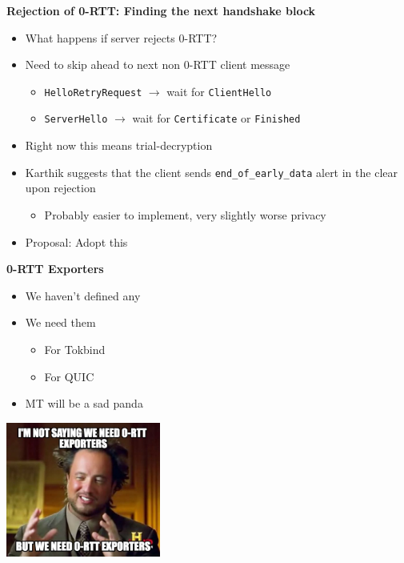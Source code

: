 \documentclass[helvetica]{seminar}
\newcommand{\heading}[1]{%
  \begin{center} 
    \large\bf 
    #1 
  \end{center} 
  \vspace{.4 in}}
\begin{document}
\begin{slide}
\heading{Rejection of 0-RTT: Finding the next handshake block}

\begin{itemize}
\item What happens if server rejects 0-RTT?
\item Need to skip ahead to next non 0-RTT client message
  \begin{itemize}
  \item \verb^HelloRetryRequest^ $\rightarrow$ wait for \verb^ClientHello^
  \item \verb^ServerHello^ $\rightarrow$ wait for \verb^Certificate^ or \verb^Finished^
  \end{itemize}
  
\item Right now this means trial-decryption
\item Karthik suggests that the client sends \verb^end_of_early_data^ alert in the clear upon rejection
  \begin{itemize}
  \item Probably easier to implement, very slightly worse privacy
  \end{itemize}

\item Proposal: Adopt this
\end{itemize}
\end{slide}


\begin{slide}
\heading{0-RTT Exporters}

\begin{minipage}{2in}
\begin{itemize}
\item We haven't defined any
\item We need them 
  \begin{itemize}
  \item For Tokbind
  \item For QUIC
  \end{itemize}
\item MT will be a sad panda
\end{itemize}
\end{minipage}
\begin{minipage}{2in}
\includegraphics[width=2in]{850509}
\end{minipage}
\end{slide}
\end{document}
